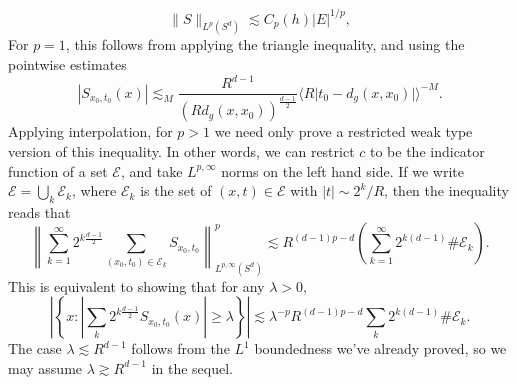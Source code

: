 \documentclass[dvipsnames,letterpaper,12pt]{article}
\begin{document}
\[ \| S \|_{L^p(S^d)} \lesssim C_p(h) |E|^{1/p}, \]
%
For $p = 1$, this follows from applying the triangle inequality, and using the pointwise estimates
%
\[ |{S\!}_{x_0,t_0}(x)| \lesssim_M \frac{R^{d-1}}{(R d_g(x,x_0))^{\frac{d-1}{2}}} \Big\langle R \big| t_0 - d_g(x,x_0) \big| \Big\rangle^{-M}. \]
%
Applying interpolation, for $p > 1$ we need only prove a restricted weak type version of this inequality. In other words, we can restrict $c$ to be the indicator function of a set $\mathcal{E}$, and take $L^{p,\infty}$ norms on the left hand side. If we write $\mathcal{E} = \bigcup_k \mathcal{E}_k$, where $\mathcal{E}_k$ is the set of $(x,t) \in \mathcal{E}$ with $|t| \sim 2^k / R$, then the inequality reads that
%
\[ \left\| \sum_{k = 1}^\infty 2^{k \frac{d-1}{2}} \sum_{(x_0,t_0) \in \mathcal{E}_k} {S\!}_{x_0,t_0} \right\|_{L^{p,\infty}(S^d)}^p \lesssim R^{(d-1)p - d} \left( \sum_{k = 1}^\infty 2^{k(d-1)} \# \mathcal{E}_k \right). \]%
%
%
%
%
%
%
%
%
This is equivalent to showing that for any $\lambda > 0$,
%
\[ \left| \left\{ x: \left|\sum_k 2^{k \frac{d-1}{2}} {S\!}_{x_0,t_0}(x)\right| \geq \lambda \right\} \right| \lesssim \lambda^{-p} R^{(d-1)p - d} \sum_k 2^{k(d-1)} \# \mathcal{E}_k. \]
%
The case $\lambda \lesssim R^{d-1}$ follows from the $L^1$ boundedness we've already proved, so we may assume $\lambda \gtrsim R^{d-1}$ in the sequel.
\end{document}
